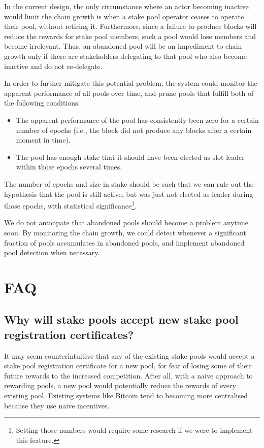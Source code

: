 \documentclass[11pt,a4paper,dvipsnames,twosided]{article}
\begin{document}
In the current design, the only circumstance where an actor becoming inactive
would limit the chain growth is when a stake pool operator ceases to operate
their pool, without retiring it. Furthermore, since a failure to produce blocks
will reduce the rewards for stake pool members, such a pool would lose members
and become irrelevant. Thus, an abandoned pool will be an impediment to chain
growth only if there are stakeholders delegating to that pool who also become
inactive and do not re-delegate.

In order to further mitigate this potential problem, the system could monitor
the apparent performance of all pools over time, and prune pools that fulfill
both of the following conditions:

\begin{itemize}
  \item The apparent performance of the pool has consistently been zero for a
    certain number of epochs (i.e., the block did not produce any blocks after a
    certain moment in time).
  \item The pool has enough stake that it should have been elected as slot
    leader within those epochs several times.
\end{itemize}

The number of epochs and size in stake should be such that we can rule out the
hypothesis that the pool is still active, but was just not elected as leader
during those epochs, with statistical significance\footnote{Setting those
  numbers would require some research if we were to implement this feature.}.

We do not anticipate that abandoned pools should become a problem anytime soon.
By monitoring the chain growth, we could detect whenever a significant fraction
of pools accumulates in abandoned pools, and implement abandoned pool detection
when necessary.

\section{FAQ}

\subsection{Why will stake pools accept new stake pool registration
  certificates?}

It may seem counterintuitive that any of the existing stake pools would accept a
stake pool registration certificate for a new pool, for fear of losing some of
their future rewards to the increased competition. After all, with a naive
approach to rewarding pools, a new pool would potentially reduce the rewards of
every existing pool. Existing systems like Bitcoin tend to becoming more
centralised because they use naive incentives.
\end{document}
